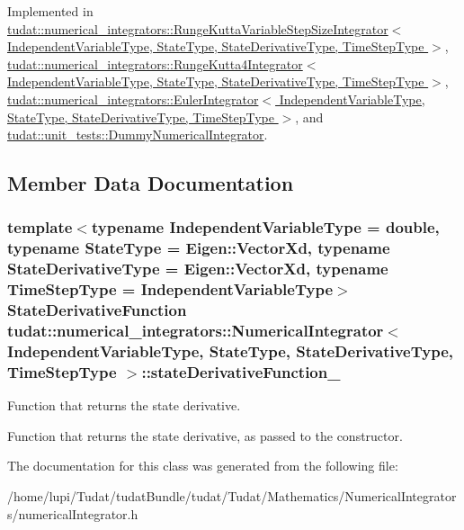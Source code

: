 Implemented in \hyperlink{classtudat_1_1numerical__integrators_1_1RungeKuttaVariableStepSizeIntegrator_a71350bc154120adfd9cf9871618eaf22}{tudat\+::numerical\+\_\+integrators\+::\+Runge\+Kutta\+Variable\+Step\+Size\+Integrator$<$ Independent\+Variable\+Type, State\+Type, State\+Derivative\+Type, Time\+Step\+Type $>$}, \hyperlink{classtudat_1_1numerical__integrators_1_1RungeKutta4Integrator_a5c08ffb9818f8e3d0de77cc3a91348ba}{tudat\+::numerical\+\_\+integrators\+::\+Runge\+Kutta4\+Integrator$<$ Independent\+Variable\+Type, State\+Type, State\+Derivative\+Type, Time\+Step\+Type $>$}, \hyperlink{classtudat_1_1numerical__integrators_1_1EulerIntegrator_a030f7c176b3b5d6a36f7d2c090be5e35}{tudat\+::numerical\+\_\+integrators\+::\+Euler\+Integrator$<$ Independent\+Variable\+Type, State\+Type, State\+Derivative\+Type, Time\+Step\+Type $>$}, and \hyperlink{classtudat_1_1unit__tests_1_1DummyNumericalIntegrator_a2fde96c0af702c49c80df90ce4540fbc}{tudat\+::unit\+\_\+tests\+::\+Dummy\+Numerical\+Integrator}.



\subsection{Member Data Documentation}
\subsubsection[{\texorpdfstring{state\+Derivative\+Function\+\_\+}{stateDerivativeFunction_}}]{\setlength{\rightskip}{0pt plus 5cm}template$<$typename Independent\+Variable\+Type = double, typename State\+Type = Eigen\+::\+Vector\+Xd, typename State\+Derivative\+Type = Eigen\+::\+Vector\+Xd, typename Time\+Step\+Type = Independent\+Variable\+Type$>$ {\bf State\+Derivative\+Function} {\bf tudat\+::numerical\+\_\+integrators\+::\+Numerical\+Integrator}$<$ Independent\+Variable\+Type, State\+Type, State\+Derivative\+Type, Time\+Step\+Type $>$\+::state\+Derivative\+Function\+\_\+\hspace{0.3cm}{\ttfamily [protected]}}\hypertarget{classtudat_1_1numerical__integrators_1_1NumericalIntegrator_a9da0d5b84797f0f84783447c6b6cffcf}{}\label{classtudat_1_1numerical__integrators_1_1NumericalIntegrator_a9da0d5b84797f0f84783447c6b6cffcf}


Function that returns the state derivative. 

Function that returns the state derivative, as passed to the constructor. 

The documentation for this class was generated from the following file\+:\begin{DoxyCompactItemize}
\item 
/home/lupi/\+Tudat/tudat\+Bundle/tudat/\+Tudat/\+Mathematics/\+Numerical\+Integrators/numerical\+Integrator.\+h\end{DoxyCompactItemize}
